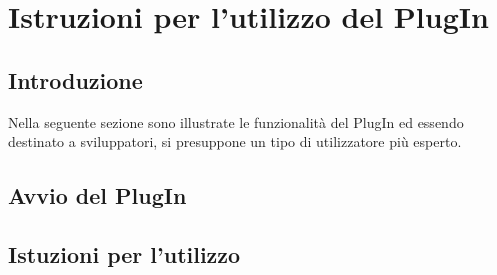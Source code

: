 \documentclass{article}
\begin{document}
\section{Istruzioni per l'utilizzo del PlugIn}
\subsection{Introduzione}
Nella seguente sezione sono illustrate le funzionalità del PlugIn ed essendo destinato a sviluppatori, si presuppone un tipo di utilizzatore più esperto.

\subsection{Avvio del PlugIn}
\subsection{Istuzioni per l'utilizzo}
\end{document}
